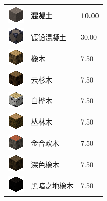 \documentclass[UTF8]{ctexart}
\begin{document}
\begin{longtable}[]{|p{1cm}|p{8cm}|p{1.5cm}|}
	\hline
	\includegraphics{.workspace/icons/immersiveengineering/immersiveengineering__stone_decoration__5.png} & 混凝土 &10.00\\
	\hline
	\includegraphics{.workspace/icons/immersiveengineering/immersiveengineering__stone_decoration__7.png} & 镀铅混凝土 &30.00\\
	\hline
	\includegraphics{.workspace/icons/minecraft/minecraft__log__0.png} & 橡木 &7.50\\
	\hline
	\includegraphics{.workspace/icons/minecraft/minecraft__log__1.png} & 云杉木 &7.50\\
	\hline
	\includegraphics{.workspace/icons/minecraft/minecraft__log__2.png} & 白桦木 &7.50\\
	\hline
	\includegraphics{.workspace/icons/minecraft/minecraft__log__3.png} & 丛林木 &7.50\\
	\hline
	\includegraphics{.workspace/icons/minecraft/minecraft__log2__0.png} & 金合欢木 &7.50\\
	\hline
	\includegraphics{.workspace/icons/minecraft/minecraft__log2__1.png} & 深色橡木 &7.50\\
	\hline
	\includegraphics{.workspace/icons/abyssalcraft/abyssalcraft__dltlog__0.png} & 黑暗之地橡木 &7.50\\

\end{longtable}
\end{document}
